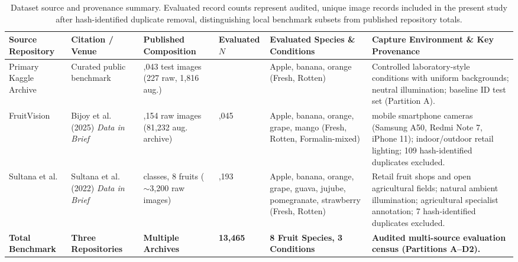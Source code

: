 \begin{table}[!t]
\caption{Dataset source and provenance summary. Evaluated record counts represent audited, unique image records included in the present study after hash-identified duplicate removal, distinguishing local benchmark subsets from published repository totals.}
\label{tab:dataset_provenance}
\centering
\footnotesize
\setlength{\tabcolsep}{2.5pt}
\begin{tabular}{>{\raggedright\arraybackslash}p{2.3cm} >{\raggedright\arraybackslash}p{2.2cm} >{\raggedright\arraybackslash}p{2.3cm} >{\centering\arraybackslash}p{1.3cm} >{\raggedright\arraybackslash}p{2.5cm} >{\raggedright\arraybackslash}p{4.2cm}}
\toprule
\textbf{Source Repository} & \textbf{Citation / Venue} & \textbf{Published Composition} & \textbf{Evaluated $N$} & \textbf{Evaluated Species \& Conditions} & \textbf{Capture Environment \& Key Provenance} \\
\midrule
Primary Kaggle Archive & Curated public benchmark & 2,043 test images \newline (227 raw, 1,816 aug.) & 227 & Apple, banana, orange \newline (Fresh, Rotten) & Controlled laboratory-style conditions with uniform backgrounds; neutral illumination; baseline ID test set (Partition A). \\
\addlinespace[3pt]
FruitVision & Bijoy et al. (2025) \cite{bijoy2025fruitvision} \newline \textit{Data in Brief} & 10,154 raw images \newline (81,232 aug. archive) & 10,045 & Apple, banana, orange, grape, mango \newline (Fresh, Rotten, Formalin-mixed) & 3 mobile smartphone cameras (Samsung A50, Redmi Note 7, iPhone 11); indoor/outdoor retail lighting; 109 hash-identified duplicates excluded. \\
\addlinespace[3pt]
Sultana et al. & Sultana et al. (2022) \cite{sultana2022extensive} \newline \textit{Data in Brief} & 16 classes, 8 fruits \newline ($\sim$3,200 raw images) & 3,193 & Apple, banana, orange, grape, guava, jujube, pomegranate, strawberry \newline (Fresh, Rotten) & Retail fruit shops and open agricultural fields; natural ambient illumination; agricultural specialist annotation; 7 hash-identified duplicates excluded. \\
\midrule
\textbf{Total Benchmark} & \textbf{Three Repositories} & \textbf{Multiple Archives} & \textbf{13,465} & \textbf{8 Fruit Species, 3 Conditions} & \textbf{Audited multi-source evaluation census (Partitions A--D2).} \\
\bottomrule
\end{tabular}
\end{table}

